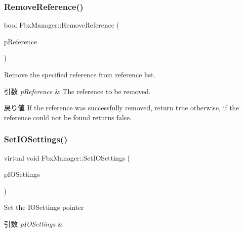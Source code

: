 \subsubsection{\texorpdfstring{Remove\+Reference()}{RemoveReference()}}
{\footnotesize\ttfamily bool Fbx\+Manager\+::\+Remove\+Reference (\begin{DoxyParamCaption}\item[{\hyperlink{class_fbx_scene_reference}{Fbx\+Scene\+Reference} $\ast$}]{p\+Reference }\end{DoxyParamCaption})}

Remove the specified reference from reference list. 
\begin{DoxyParams}{引数}
{\em p\+Reference} & The reference to be removed. \\
\hline
\end{DoxyParams}
\begin{DoxyReturn}{戻り値}
If the reference was successfully removed, return {\ttfamily true} otherwise, if the reference could not be found returns {\ttfamily false}. 
\end{DoxyReturn}
\mbox{\label{class_fbx_manager_ad28f1773813b9856a1415a50d73ad437}} 
\subsubsection{\texorpdfstring{Set\+I\+O\+Settings()}{SetIOSettings()}}
{\footnotesize\ttfamily virtual void Fbx\+Manager\+::\+Set\+I\+O\+Settings (\begin{DoxyParamCaption}\item[{\hyperlink{class_fbx_i_o_settings}{Fbx\+I\+O\+Settings} $\ast$}]{p\+I\+O\+Settings }\end{DoxyParamCaption})\hspace{0.3cm}{\ttfamily [virtual]}}

Set the I\+O\+Settings pointer 
\begin{DoxyParams}{引数}
{\em p\+I\+O\+Settings} & \\
\hline
\end{DoxyParams}
\mbox{\label{class_fbx_manager_a3a0c4e7cf1ad942b6af60e0a67eda9f5}} 

